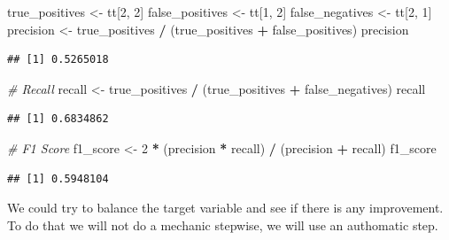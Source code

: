 \documentclass[
  twoside]{article}
\newenvironment{Shaded}{\begin{snugshade}}{\end{snugshade}}
\newcommand{\CommentTok}[1]{\textcolor[rgb]{0.56,0.35,0.01}{\textit{#1}}}
\newcommand{\DecValTok}[1]{\textcolor[rgb]{0.00,0.00,0.81}{#1}}
\newcommand{\FunctionTok}[1]{\textcolor[rgb]{0.13,0.29,0.53}{\textbf{#1}}}
\newcommand{\NormalTok}[1]{#1}
\newcommand{\OtherTok}[1]{\textcolor[rgb]{0.56,0.35,0.01}{#1}}
\newcommand{\SpecialCharTok}[1]{\textcolor[rgb]{0.81,0.36,0.00}{\textbf{#1}}}
\begin{document}
\begin{Shaded}
\begin{Highlighting}[]
\NormalTok{true\_positives }\OtherTok{\textless{}{-}}\NormalTok{ tt[}\DecValTok{2}\NormalTok{, }\DecValTok{2}\NormalTok{]}
\NormalTok{false\_positives }\OtherTok{\textless{}{-}}\NormalTok{ tt[}\DecValTok{1}\NormalTok{, }\DecValTok{2}\NormalTok{]}
\NormalTok{false\_negatives }\OtherTok{\textless{}{-}}\NormalTok{ tt[}\DecValTok{2}\NormalTok{, }\DecValTok{1}\NormalTok{]}
\NormalTok{precision }\OtherTok{\textless{}{-}}\NormalTok{ true\_positives }\SpecialCharTok{/}\NormalTok{ (true\_positives }\SpecialCharTok{+}\NormalTok{ false\_positives)}
\NormalTok{precision}
\end{Highlighting}
\end{Shaded}

\begin{verbatim}
## [1] 0.5265018
\end{verbatim}

\begin{Shaded}
\begin{Highlighting}[]
\CommentTok{\# Recall}
\NormalTok{recall }\OtherTok{\textless{}{-}}\NormalTok{ true\_positives }\SpecialCharTok{/}\NormalTok{ (true\_positives }\SpecialCharTok{+}\NormalTok{ false\_negatives)}
\NormalTok{recall}
\end{Highlighting}
\end{Shaded}

\begin{verbatim}
## [1] 0.6834862
\end{verbatim}

\begin{Shaded}
\begin{Highlighting}[]
\CommentTok{\# F1 Score}
\NormalTok{f1\_score }\OtherTok{\textless{}{-}} \DecValTok{2} \SpecialCharTok{*}\NormalTok{ (precision }\SpecialCharTok{*}\NormalTok{ recall) }\SpecialCharTok{/}\NormalTok{ (precision }\SpecialCharTok{+}\NormalTok{ recall)}
\NormalTok{f1\_score}
\end{Highlighting}
\end{Shaded}

\begin{verbatim}
## [1] 0.5948104
\end{verbatim}

We could try to balance the target variable and see if there is any
improvement. To do that we will not do a mechanic stepwise, we will use
an authomatic step.

\begin{Shaded}
\end{Shaded}
\end{document}
